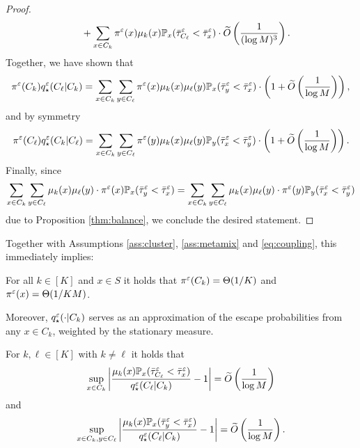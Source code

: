 \begin{proof}
\begin{align*}
&\qquad + \sum_{x\in C_k} \pi^\varepsilon(x)\mu_k(x) \mathbb{P}_x(\bar{\tau}_{C_\ell}^\varepsilon < \bar{\tau}_x^\varepsilon) \cdot \widetilde{O}\left(\frac{1}{(\log M)^3}\right).
\end{align*}
Together, we have shown that
\begin{align*}
\pi^\varepsilon(C_k)q_\star^\varepsilon(C_\ell|C_k) =\sum_{x\in C_k}\sum_{y\in C_\ell} \pi^\varepsilon(x)\mu_k(x)\mu_\ell(y) \mathbb{P}_x(\bar{\tau}_y^\varepsilon < \bar{\tau}_x^\varepsilon)\cdot \left(1+\widetilde{O}\left(\frac{1}{\log M}\right)\right),
\end{align*}
and by symmetry
\begin{align*}
\pi^\varepsilon(C_\ell)q_\star^\varepsilon(C_k|C_\ell) =\sum_{x\in C_k}\sum_{y\in C_\ell} \pi^\varepsilon(y)\mu_k(x)\mu_\ell(y) \mathbb{P}_y(\bar{\tau}_x^\varepsilon < \bar{\tau}_y^\varepsilon)\cdot \left(1+\widetilde{O}\left(\frac{1}{\log M}\right)\right).
\end{align*}
Finally, since
\begin{align*}
\sum_{x\in C_k}\sum_{y\in C_\ell} \mu_k(x)\mu_\ell(y) \cdot \pi^\varepsilon(x)\mathbb{P}_x(\bar{\tau}_y^\varepsilon < \bar{\tau}_x^\varepsilon) = \sum_{x\in C_k}\sum_{y\in C_\ell} \mu_k(x)\mu_\ell(y) \cdot \pi^\varepsilon(y)\mathbb{P}_y(\bar{\tau}_x^\varepsilon < \bar{\tau}_y^\varepsilon)
\end{align*}
due to Proposition \ref{thm:balance}, we conclude the desired statement.
\end{proof}

Together with Assumptions \ref{ass:cluster}, \ref{ass:metamix} and \eqref{eq:coupling}, this immediately implies:
\begin{cor}\label{thm:uniform}
For all $k\in [K]$ and $x\in S$ it holds that $\pi^\varepsilon(C_k) = \Theta(1/K)$ and $\pi^\varepsilon(x) = \Theta(1/KM)$.
\end{cor}

Moreover, $q_\star^\varepsilon(\cdot|C_k)$ serves as an approximation of the escape probabilities from any $x\in C_k$, weighted by the stationary measure.

\begin{prop}\label{thm:mupq}
For $k,\ell\in[K]$ with $k\neq\ell$ it holds that
\begin{equation}\label{eq:mupq1}
\sup_{x\in C_k} \left\lvert\frac{\mu_k(x)\mathbb{P}_x(\bar{\tau}_{C_\ell}^\varepsilon < \bar{\tau}_x^\varepsilon)}{q_\star^\varepsilon(C_\ell|C_k)} -1\right\rvert = \widetilde{O}\left(\frac{1}{\log M}\right)
\end{equation}
and
\begin{equation}\label{eq:mupq2}
\sup_{x\in C_k,y\in C_\ell} \left\lvert\frac{\mu_k(x)\mathbb{P}_x(\bar{\tau}_y^\varepsilon < \bar{\tau}_x^\varepsilon)}{q_\star^\varepsilon(C_\ell|C_k)} -1\right\rvert = \widetilde{O}\left(\frac{1}{\log M}\right).
\end{equation}
\end{prop}

